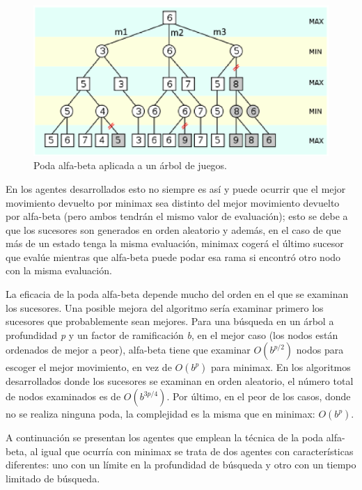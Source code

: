 \begin{figure}[h]
	\centering
	\includegraphics[scale=0.8]{contenido/cap3/imagenes/podaalfabeta.eps}
	\caption{Poda alfa-beta aplicada a un árbol de juegos.}
	\label{fig:alfabeta}
\end{figure}

En los agentes desarrollados esto no siempre es así y puede ocurrir que el mejor movimiento devuelto por minimax sea distinto del mejor movimiento devuelto por alfa-beta (pero ambos tendrán el mismo valor de evaluación); esto se debe a que los sucesores son generados en orden aleatorio y además, en el caso de que más de un estado tenga la misma evaluación, minimax cogerá el último sucesor que evalúe mientras que alfa-beta puede podar esa rama si encontró otro nodo con la misma evaluación.

La eficacia de la poda alfa-beta depende mucho del orden en el que se examinan los sucesores.
Una posible mejora del algoritmo sería examinar primero los sucesores que probablemente sean mejores.
Para una búsqueda en un árbol a profundidad \textit{p} y un factor de ramificación \textit{b}, en el mejor caso (los nodos están ordenados de mejor a peor), alfa-beta tiene que examinar $O(b^{p/2})$ nodos para escoger el mejor movimiento, en vez de $O(b^p)$ para minimax.%
En los algoritmos desarrollados donde los sucesores se examinan en orden aleatorio, el número total de nodos examinados es de $O(b^{3p/4})$.
Por último, en el peor de los casos, donde no se realiza ninguna poda, la complejidad es la misma que en minimax: $O(b^p)$.

\bigskip
A continuación se presentan los agentes que emplean la técnica de la poda alfa-beta, al igual que ocurría con minimax se trata de dos agentes con características diferentes: uno con un límite en la profundidad de búsqueda y otro con un tiempo limitado de búsqueda.

